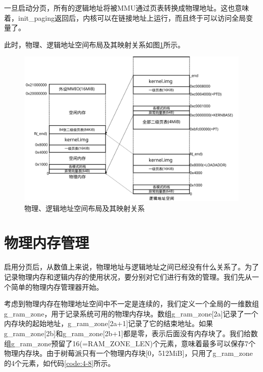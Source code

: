 \documentclass[main.tex]{subfiles}
\begin{document}
\begin{CJK*}{UTF8}{song}
\begin{code}
\label{code:4-7}
\inputminted[firstline=187,lastline=209,linenos,numbersep=5pt,frame=lines,framesep=2mm]{c}{src/chapter04/kernel/machdep.c}
\end{code}

\noindent
一旦启动分页，所有的逻辑地址将被MMU通过页表转换成物理地址。这也意味着，init\_paging返回后，内核可以在链接地址上运行，而且终于可以访问全局变量了。

\par
此时，物理、逻辑地址空间布局及其映射关系如图\ref{figure:4-7}所示。

\begin{figure}[htp]
\centering
\includegraphics[scale=0.4]{figures/4-7}
\caption{物理、逻辑地址空间布局及其映射关系}
\label{figure:4-7}
\end{figure}

\section{物理内存管理}
启用分页后，从数值上来说，物理地址与逻辑地址之间已经没有什么关系了。为了记录物理内存和逻辑内存的使用状况，要分别对它们进行有效的管理。我们先从一个简单的物理内存管理器开始。

\par
考虑到物理内存在物理地址空间中不一定是连续的，我们定义一个全局的一维数组g\_ram\_zone，用于记录系统可用的物理内存块。数组g\_ram\_zone[2a]记录了一个内存块的起始地址，g\_ram\_zone[2a+1]记录了它的结束地址。如果g\_ram\_zone[2b]和g\_ram\_zone[2b+1]都是零，表示后面没有内存块了。我们给数组g\_ram\_zone预留了16(=RAM\_ZONE\_LEN)个元素，意味着最多可以保存7个物理内存块。由于树莓派只有一个物理内存块[0，512MiB]，只用了g\_ram\_zone的4个元素，如代码\ref{code:4-8}所示。


\end{CJK*}
\end{document}
